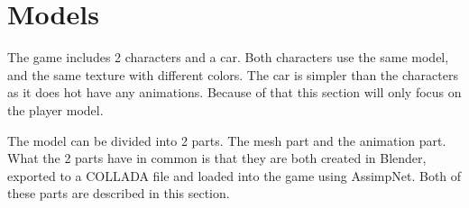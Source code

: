 \section{Models} \label{sec:theory_theory_models}
The game includes 2 characters and a car.
Both characters use the same model, and the same texture with different colors.
The car is simpler than the characters as it does hot have any animations.
Because of that this section will only focus on the player model.

The model can be divided into 2 parts.
The mesh part and the animation part.
What the 2 parts have in common is that they are both created in Blender, exported to a COLLADA file and loaded into the game using AssimpNet.
Both of these parts are described in this section.



